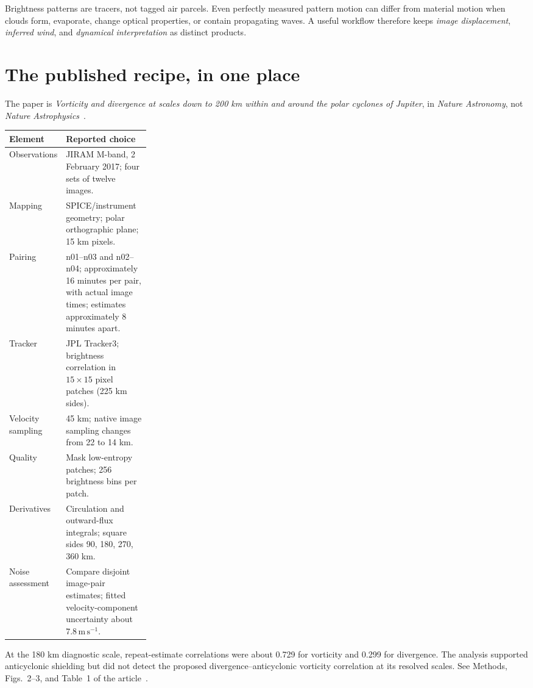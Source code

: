 \documentclass[11pt]{article}
\newcommand{\ms}{\mathrm{m\,s^{-1}}}
\begin{document}
Brightness patterns are tracers, not tagged air parcels. Even perfectly
measured pattern motion can differ from material motion when clouds form,
evaporate, change optical properties, or contain propagating waves. A useful
workflow therefore keeps \emph{image displacement}, \emph{inferred wind}, and
\emph{dynamical interpretation} as distinct products.

\section{The published recipe, in one place}\label{sec:recipe}

The paper is \emph{Vorticity and divergence at scales down to 200 km within
and around the polar cyclones of Jupiter}, in \emph{Nature Astronomy}, not
\emph{Nature Astrophysics}~\cite{ingersoll}.

\begin{center}
\small
\begin{tabularx}{\linewidth}{@{}p{0.27\linewidth}X@{}}
\toprule
Element & Reported choice \\
\midrule
Observations & JIRAM M-band, 2 February 2017; four sets of twelve images. \\
Mapping & SPICE/instrument geometry; polar orthographic plane; 15 km pixels. \\
Pairing & n01--n03 and n02--n04; approximately 16 minutes per pair,
with actual image times; estimates approximately 8 minutes apart. \\
Tracker & JPL Tracker3; brightness correlation in $15\times15$ pixel
patches (225 km sides). \\
Velocity sampling & 45 km; native image sampling changes from 22 to 14 km. \\
Quality & Mask low-entropy patches; 256 brightness bins per patch. \\
Derivatives & Circulation and outward-flux integrals; square sides
90, 180, 270, 360 km. \\
Noise assessment & Compare disjoint image-pair estimates; fitted
velocity-component uncertainty about $7.8\,\ms$. \\
\bottomrule
\end{tabularx}
\end{center}

At the 180 km diagnostic scale, repeat-estimate correlations were about
0.729 for vorticity and 0.299 for divergence. The analysis supported
anticyclonic shielding but did not detect the proposed divergence--anticyclonic
vorticity correlation at its resolved scales. See Methods, Figs.~2--3, and
Table~1 of the article~\cite{ingersoll}.
\end{document}
